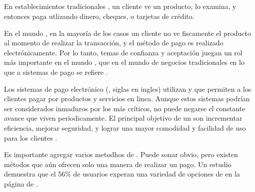 \subsection{\paymentsCOM}\label{cap:solucionImplementada:section:dashboard:subsection:payment}
	En establecimientos tradicionales \brickandmortar , un cliente ve un producto, lo examina, y entonces paga utlizando dinero, cheques, o tarjetas de crédito.

	En el mundo \ecommerceCOM, en la mayoría de los casos un cliente no ve fiscamente el producto al momento de realizar la transacción, y el método de pago es realizado electrónicamente. Por lo tanto, temas de confianza y aceptación juegan un rol más importante en el mundo \ecommerceCOM, que en el mundo de negocios tradicionales en lo que a sistemas de pago se refiere \cite{bidgoli2002electronic}.

	Los sistemas de pago electrónico (\epsSiglasCOM, siglas en ingles) utilizan \hardwarePC y \softwarePC que permiten a los clientes pagar por productos y servicios en linea. Aunque estos sistemas podrían ser considerados inmaduros por los más críticos, no puede negarse el constante avance que viven periodicamente. El principal objetivo de un \epsSiglasCOM son incrementar eficiencia, mejorar seguridad, y lograr una mayor comodidad y facilidad de uso para los clientes \cite{bidgoli2002electronic}.

	Es importante agregar varios metodhos de \paymentsCOM. Puede sonar obvio, pero existen métodos que aún ofrecen solo una manera de realizar un pago. Un estudio demuestra que el 56\% de usuarios experan una variedad de opciones de \paymentsCOM en la página de \checkoutCOM \cite{online_kissmetrics_easy_payment_process}.

